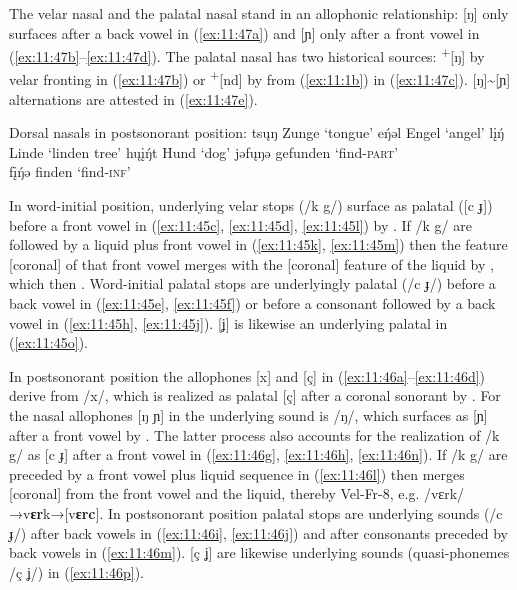 The velar nasal and the palatal nasal stand in an allophonic relationship: [ŋ] only surfaces after a back vowel in (\ref{ex:11:47a}) and [ɲ] only after a front vowel in (\ref{ex:11:47b}--\ref{ex:11:47d}). The palatal nasal has two historical sources:  \textsuperscript{+}[ŋ] by velar fronting in (\ref{ex:11:47b}) or  \textsuperscript{+}[nd] by  from (\ref{ex:11:1b}) in (\ref{ex:11:47c}). [ŋ]{\textasciitilde}[ɲ] alternations are attested in (\ref{ex:11:47e}).

\ea%
\label{ex:11:47}Dorsal nasals in postsonorant position:
\ea\label{ex:11:47a} tsųŋ \tab [tsʊŋ] \tab Zunge \tab ‘tongue’ 
\ex\label{ex:11:47b} e\'{ŋ}əl \tab [eɲəl] \tab Engel \tab ‘angel’ 
\ex\label{ex:11:47c} l\k{i}\'{ŋ} \tab  [lɪɲ] \tab Linde \tab ‘linden tree’ 
\ex\label{ex:11:47d} hų\k{i}\'{ŋ}t \tab [hʊɪɲt] \tab Hund \tab ‘dog’ 
\ex\label{ex:11:47e} jəfųŋə \tab [ʝəfʊŋə] \tab gefunden \tab ‘find-\textsc{part}’ \\
    f\k{i}\'{ŋ}ə \tab [fɪɲə] \tab finden \tab ‘find-\textsc{inf}’ 
\z 
\z 

In word-initial position, underlying velar stops (/k g/) surface as palatal ([c ɟ]) before a front vowel in (\ref{ex:11:45c}, \ref{ex:11:45d}, \ref{ex:11:45l}) by . If /k g/ are followed by a liquid plus front vowel in (\ref{ex:11:45k}, \ref{ex:11:45m}) then the feature [coronal] of that front vowel merges with the [coronal] feature of the liquid by , which then  . Word-initial palatal stops are underlyingly palatal (/c ɟ/) before a back vowel in (\ref{ex:11:45e}, \ref{ex:11:45f}) or before a consonant followed by a back vowel in (\ref{ex:11:45h}, \ref{ex:11:45j}). [ʝ] is likewise an underlying palatal in (\ref{ex:11:45o}).

In postsonorant position the allophones [x] and [ç] in (\ref{ex:11:46a}--\ref{ex:11:46d}) derive from /x/, which is realized as palatal [ç] after a coronal sonorant by . For the nasal allophones [ŋ ɲ] in  the underlying sound is /ŋ/, which surfaces as [ɲ] after a front vowel by . The latter process also accounts for the realization of /k g/ as [c ɟ] after a front vowel in (\ref{ex:11:46g}, \ref{ex:11:46h}, \ref{ex:11:46n}). If /k g/ are preceded by a front vowel plus liquid sequence in (\ref{ex:11:46l}) then  merges [coronal] from the front vowel and the liquid, thereby  Vel-Fr-8, e.g. /vɛrk/→{\textbar}v\textbf{ɛr}k{\textbar}→[v\textbf{ɛrc}]. In postsonorant position palatal stops are underlying sounds (/c ɟ/) after back vowels in (\ref{ex:11:46i}, \ref{ex:11:46j}) and after consonants preceded by back vowels in (\ref{ex:11:46m}). [ç ʝ] are likewise underlying sounds (quasi-phonemes /ç ʝ/) in (\ref{ex:11:46p}). 

